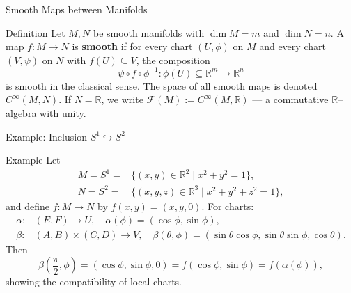 \begin{frame}{Smooth Maps between Manifolds}
\vspace{-0.3cm}
\begin{block}{Definition}
Let $M,N$ be smooth manifolds with $\dim M=m$ and $\dim N=n$.
A map $f:M\to N$ is \textbf{smooth} if for every chart $(U,\phi)$ on $M$ and every chart $(V,\psi)$ on $N$ with $f(U)\subseteq V$,
the composition
\vspace{-0.1cm}
\[
\psi\circ f\circ\phi^{-1} : \phi(U)\subseteq\mathbb{R}^m \to \mathbb{R}^n
\]
is smooth in the classical sense.
The space of all smooth maps is denoted $C^{\infty}(M,N)$.
If $N=\mathbb{R}$, we write $\mathcal{F}(M):=C^{\infty}(M,\mathbb{R})$ — a commutative $\mathbb{R}$–algebra with unity.
\end{block}
\vspace{-0.3cm}
\begin{center}
\end{center}
\end{frame}


\begin{frame}{Example: Inclusion $S^1\hookrightarrow S^2$}
\vspace{-0.2cm}
\begin{block}{Example}
Let
\vspace{-0.4cm}
\begin{align*}
    M=S^1=&\{(x,y)\in\mathbb{R}^2\mid x^2+y^2=1\},\\
N=S^2=&\{(x,y,z)\in\mathbb{R}^3\mid x^2+y^2+z^2=1\},
\end{align*}
and define $f:M\to N$ by $f(x,y)=(x,y,0)$. For charts:
\begin{align*}
\alpha:&(E,F)\to U,\quad \alpha(\phi)=(\cos\phi,\sin\phi),\\
\beta:&(A,B)\times(C,D)\to V,\quad \beta(\theta,\phi)=(\sin\theta\cos\phi,\sin\theta\sin\phi,\cos\theta).
\end{align*}
Then
\[
\beta\!\left(\frac{\pi}{2},\phi\right)=(\cos\phi,\sin\phi,0)=f(\cos\phi,\sin\phi)=f(\alpha(\phi)),
\]
showing the compatibility of local charts.
\end{block}
\end{frame}

